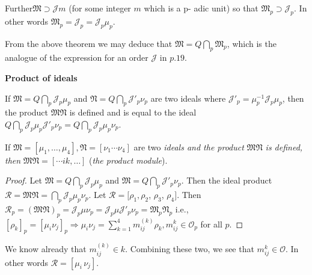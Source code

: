 Further\pageoriginale $\mathfrak{M} \supset \mathcal{J} m$ (for some integer $m$
which is a p- adic unit) so that $\mathfrak{M}_p \supset
\mathcal{J}_{p}$. In other words $\mathfrak{M}_p = \mathcal{J}_{p}=
\mathcal{J}_{p} \mu_p$. 
\begin{note}
  From the above theorem we may deduce that $\mathfrak{M} = Q \bigcap
  \limits_{p} \mathfrak{M}_p$, which is the analogue of the expression
  for an order $\mathcal{J}$ in $p. 19$. 
\end{note}

\noindent
\textbf{Product of ideals}

If $\mathfrak{M} = Q \bigcap \limits_{p} \mathcal{J}_{p} \mu_{p}$ and
$\mathfrak{N} = Q \bigcap \limits_{p} \mathcal{J}'_{p} \nu_p$ are two
ideals where $\mathcal{J}'_{p} = \mu^{-1}_{p} \mathcal{J}_{p} \mu_p$,
then the product $\mathfrak{M} \mathfrak{N}$ is defined and is equal
to the ideal $Q \bigcap \limits_{p} \mathcal{J}_{p}
\mu_{p}\mathcal{J}'_{p} \nu_p = Q \bigcap \limits_{p} \mathcal{J}_{p}
\mu_{p} \nu_p$. 
\begin{theorem}\label{chap1:sec2:thm8} %
  If $\mathfrak{M} = [\mu_1,  \ldots,  \mu_4], \mathfrak{N} = [ \nu_1
    \cdots \nu_4]$ are two {\em ideals and the product} $\mathfrak{M}
  \mathfrak{N}$ {\em is defined,  then } $\mathfrak{M} \mathfrak{N} =
           [\cdots i k, \ldots]$ ({\em the product module}). 
\end{theorem}

\begin{proof}
  Let $\mathfrak{M}  = Q \bigcap \limits_{p} \mathcal{J}_p \mu_p$ and
  $\mathfrak{M} = Q \bigcap \limits_{p} \mathcal{J}'_p \nu_p$. Then the
  ideal product $\mathscr{R}= \mathfrak{M} \mathfrak{N} = \bigcap
  \limits_{p} \mathcal{J}_p \mu_p \nu_p$. Let $\mathscr{R}= [\rho_1,
    \rho_2 $, $\rho_3$, $\rho_4]$. Then $\mathscr{R}_p = (\mathfrak{M}
  \mathfrak{N})_p = \mathcal{J}_p \mu \nu_p = \mathcal{J}_p \mu
  \mathcal{J}'_p \nu_p = \mathfrak{M}_p \mathfrak{N}_p$ i.e., $[\rho_k]_p
  = [\mu_i \nu_j]_p \Rightarrow \mu_i \nu_j = \sum \limits^4_{k=1}
  m^{(k)}_{ij} \rho_k, m^k_{ij} \in \mathscr{O}_p$ for all $p$.  
\end{proof}

We know already that $m^{(k)}_{ij} \in k$. Combining these two, we see
that $m^k_{ij} \in \mathscr{O}$. In other words $\mathscr{R}= [\mu_i\,
  \nu_j]$.  

